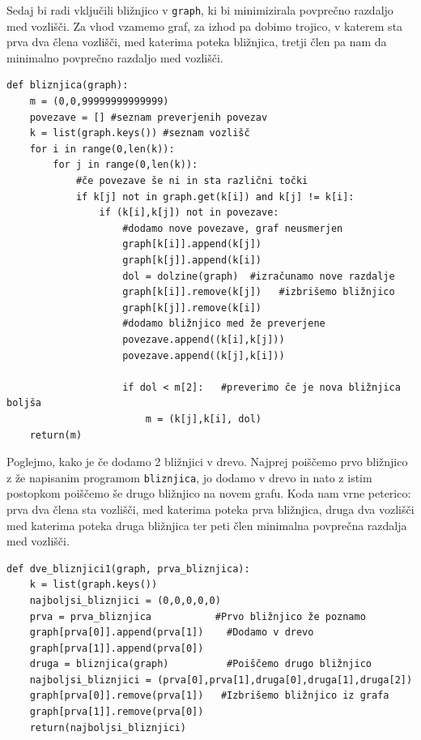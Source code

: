 \documentclass[a4paper,10pt]{article}
\begin{document}
Sedaj bi radi vključili bližnjico v \texttt{graph}, ki bi minimizirala povprečno razdaljo med vozlišči. Za vhod vzamemo graf, za izhod pa dobimo trojico, v katerem sta prva dva člena vozlišči, med katerima poteka bližnjica, tretji člen pa nam da minimalno povprečno razdaljo med vozlišči.

\begin{verbatim}
def bliznjica(graph):
    m = (0,0,99999999999999)
    povezave = [] #seznam preverjenih povezav
    k = list(graph.keys()) #seznam vozlišč
    for i in range(0,len(k)):
        for j in range(0,len(k)):
            #če povezave še ni in sta različni točki
            if k[j] not in graph.get(k[i]) and k[j] != k[i]:
                if (k[i],k[j]) not in povezave:
                    #dodamo nove povezave, graf neusmerjen
                    graph[k[i]].append(k[j])
                    graph[k[j]].append(k[i])
                    dol = dolzine(graph)  #izračunamo nove razdalje
                    graph[k[i]].remove(k[j])   #izbrišemo bližnjico
                    graph[k[j]].remove(k[i])
                    #dodamo bližnjico med že preverjene
                    povezave.append((k[i],k[j]))
                    povezave.append((k[j],k[i]))

                    if dol < m[2]:   #preverimo če je nova bližnjica boljša
                        m = (k[j],k[i], dol)
    return(m)
\end{verbatim}

Poglejmo, kako je če dodamo 2 bližnjici v drevo. Najprej poiščemo prvo bližnjico z že napisanim programom \texttt{bliznjica}, jo dodamo v drevo in nato z istim postopkom poiščemo še drugo bližnjico na novem grafu. Koda nam vrne peterico: prva dva člena sta vozlišči, med katerima poteka prva bližnjica, druga dva vozlišči med katerima poteka druga bližnjica ter peti člen minimalna povprečna razdalja med vozlišči. 

\begin{verbatim}
def dve_bliznjici1(graph, prva_bliznjica):
    k = list(graph.keys())
    najboljsi_bliznjici = (0,0,0,0,0)
    prva = prva_bliznjica           #Prvo bližnjico že poznamo
    graph[prva[0]].append(prva[1])    #Dodamo v drevo
    graph[prva[1]].append(prva[0])
    druga = bliznjica(graph)          #Poiščemo drugo bližnjico
    najboljsi_bliznjici = (prva[0],prva[1],druga[0],druga[1],druga[2])
    graph[prva[0]].remove(prva[1])   #Izbrišemo bližnjico iz grafa
    graph[prva[1]].remove(prva[0])
    return(najboljsi_bliznjici)
\end{verbatim}
\end{document}
